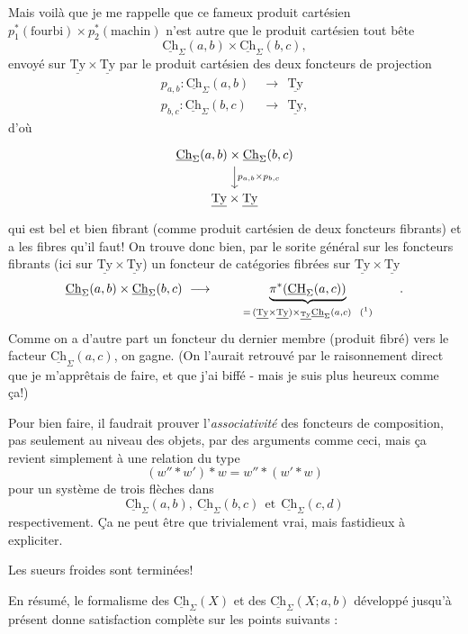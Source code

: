 \documentclass[11pt]{article}
\newcommand{\printedpage}[1]{\marginpar{\footnotesize p.~#1}}
\newcommand{\msp}[1]{\marginpar{\footnotesize [#1]}}
\newcommand{\Ch}{\underline{\mathrm{Ch}}}
\newcommand{\Ty}{\underline{\mathrm{Ty}}}
\newcommand{\CH}{\underline{\mathrm{CH}}}
\begin{document}
\msp{page 80}
Mais voilà que je me rappelle que ce fameux produit cartésien $p_1^*(\text{fourbi})\times p_2^*(\text{machin})$ n'est autre que le produit cartésien tout bête
\[
\Ch_{\Sigma}(a,b)\times\Ch_{\Sigma}(b,c),
\]
envoyé sur $\Ty\times\Ty$ par le produit cartésien des deux foncteurs de projection
\[
\begin{aligned}
p_{a,b} : \Ch_{\Sigma}(a,b) &\ \longrightarrow\ \ \Ty\\
p_{b,c} : \Ch_{\Sigma}(b,c) &\ \longrightarrow\ \ \Ty,
\end{aligned}
\]
d'où
\[
\begin{tikzcd}
\Ch_{\Sigma}(a,b)\times\Ch_{\Sigma}(b,c) \ar[d,"p_{a,b}\times p_{b,c}"] \\
\Ty\times\Ty
\end{tikzcd}
\]
\msp{page 81}
qui est bel et bien fibrant (comme produit cartésien de deux foncteurs fibrants) et a les fibres qu'il faut! On trouve donc bien, par le sorite général sur les foncteurs fibrants (ici sur $\Ty\times\Ty$) un foncteur de catégories fibrées sur $\Ty\times\Ty$
\[
\Ch_{\Sigma}(a,b)\times\Ch_{\Sigma}(b,c) \ \longrightarrow\ \qquad \underbrace{\pi^*(\CH_{\Sigma}(a,c))}_{=\,(\Ty\times\Ty)\times_{\Ty}\Ch_{\Sigma}(a,c)\ \ \text{(\footnotemark)}} \qquad .
\]
\footnotetext{produit fibré par $\pi : \Ty\times\Ty \longrightarrow \Ty$.}
Comme on a d'autre part un foncteur du dernier membre (produit fibré) vers le facteur $\Ch_{\Sigma}(a,c)$, on gagne. (On l'aurait retrouvé par le raisonnement direct que je m'apprêtais de faire, et que j'ai biffé - mais je suis plus heureux comme ça!)

\printedpage{53}
Pour bien faire, il faudrait prouver l'\textit{associativité} des foncteurs de composition, pas seulement au niveau des objets, par des arguments comme ceci, mais ça revient simplement à une relation du type
\[
(w''*w')*w = w''*(w'*w)
\]
pour un système de trois flèches dans
\[
\Ch_{\Sigma}(a,b),\ \Ch_{\Sigma}(b,c)\ \ \text{et}\ \ \Ch_{\Sigma}(c,d)
\]
respectivement. Ça ne peut être que trivialement
\msp{page 82}
vrai, mais fastidieux à expliciter.

Les sueurs froides sont terminées!

En résumé, le formalisme des $\Ch_{\Sigma}(X)$ et des $\Ch_{\Sigma}(X;a,b)$ développé jusqu'à présent donne satisfaction complète sur les points suivants :
\end{document}
